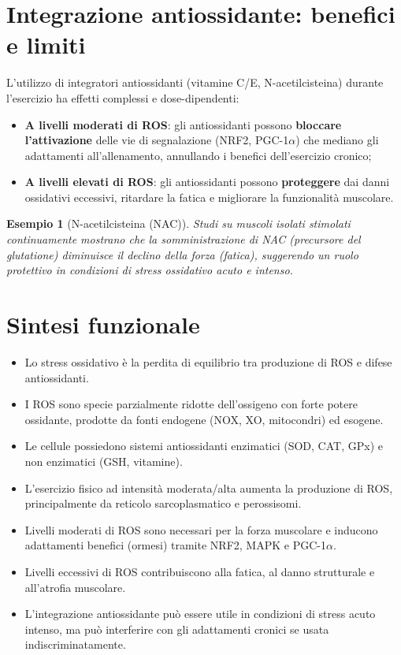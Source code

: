 \documentclass[12pt,a4paper]{report}
\newtheorem{esempio}{Esempio}[section]
\begin{document}
\section{Integrazione antiossidante: benefici e limiti}
L'utilizzo di integratori antiossidanti (vitamine C/E, N-acetilcisteina) durante l'esercizio ha effetti complessi e dose-dipendenti:
\begin{itemize}
\item \textbf{A livelli moderati di ROS}: gli antiossidanti possono \textbf{bloccare l'attivazione} delle vie di segnalazione (NRF2, PGC-1\(\alpha\)) che mediano gli adattamenti all'allenamento, annullando i benefici dell'esercizio cronico;
\item \textbf{A livelli elevati di ROS}: gli antiossidanti possono \textbf{proteggere} dai danni ossidativi eccessivi, ritardare la fatica e migliorare la funzionalità muscolare.
\end{itemize}

\begin{esempio}[N-acetilcisteina (NAC)]
Studi su muscoli isolati stimolati continuamente mostrano che la somministrazione di NAC (precursore del glutatione) diminuisce il declino della forza (fatica), suggerendo un ruolo protettivo in condizioni di stress ossidativo acuto e intenso.
\end{esempio}

\section{Sintesi funzionale}
\begin{itemize}
\item Lo stress ossidativo è la perdita di equilibrio tra produzione di ROS e difese antiossidanti.
\item I ROS sono specie parzialmente ridotte dell'ossigeno con forte potere ossidante, prodotte da fonti endogene (NOX, XO, mitocondri) ed esogene.
\item Le cellule possiedono sistemi antiossidanti enzimatici (SOD, CAT, GPx) e non enzimatici (GSH, vitamine).
\item L'esercizio fisico ad intensità moderata/alta aumenta la produzione di ROS, principalmente da reticolo sarcoplasmatico e perossisomi.
\item Livelli moderati di ROS sono necessari per la forza muscolare e inducono adattamenti benefici (ormesi) tramite NRF2, MAPK e PGC-1\(\alpha\).
\item Livelli eccessivi di ROS contribuiscono alla fatica, al danno strutturale e all'atrofia muscolare.
\item L'integrazione antiossidante può essere utile in condizioni di stress acuto intenso, ma può interferire con gli adattamenti cronici se usata indiscriminatamente.
\end{itemize}
\end{document}
